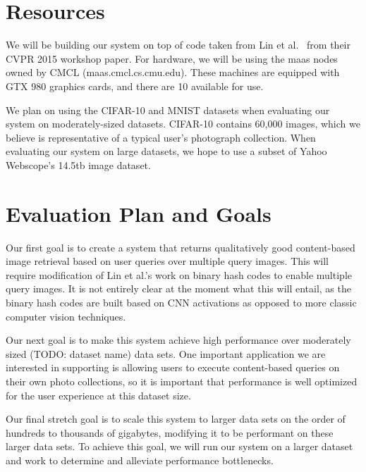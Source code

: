 \section{Resources}
We will be building our system on top of code taken from Lin et al.~\cite{gitrepo} from their CVPR 2015 workshop paper.
For hardware, we will be using the maas nodes owned by CMCL (maas.cmcl.cs.cmu.edu).
These machines are equipped with GTX 980 graphics cards, and there are 10 available for use.

We plan on using the CIFAR-10 and MNIST datasets when evaluating our system on moderately-sized datasets.
CIFAR-10 contains 60,000 images, which we believe is representative of a typical user's photograph collection.
When evaluating our system on large datasets, we hope to use a subset of Yahoo Webscope's 14.5tb image dataset.

\section{Evaluation Plan and Goals}

Our first goal is to create a system that returns qualitatively good content-based image retrieval based on user queries over multiple query images.
This will require modification of Lin et al.'s work on binary hash codes to enable multiple query images.
It is not entirely clear at the moment what this will entail, as the binary hash codes are built based on CNN activations as opposed to more
classic computer vision techniques.

Our next goal is to make this system achieve high performance over moderately sized (TODO: dataset name) data sets.
One important application we are interested in supporting is allowing users to execute content-based queries on their
own photo collections, so it is important that performance is well optimized for the user experience at this dataset size.

Our final stretch goal is to scale this system to larger data sets on the order of hundreds to thousands of gigabytes,
modifying it to be performant on these larger data sets.
To achieve this goal, we will run our system on a larger dataset and work to determine and alleviate performance bottlenecks.
